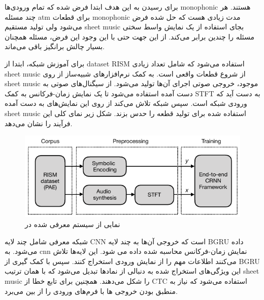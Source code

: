 برای رسیدن به این هدف ابتدا فرض شده که تمام ورودی‌ها \gls{monophonic} هستند. هر
چند مسئله \gls{atm} برای قطعات \gls{monophonic} مدت زیادی هست که حل شده فرض
می‌شود ولی تولید مستقیم \gls{sheet music} بجای استفاده از یک نمایش واسط سختی
مسئله را چندین برابر می‌کند. از این جهت حتی با این وجود این فرض، مسئله همچنان
بسیار چالش برانگیز باقی می‌ماند.

برای آموزش شبکه، ابتدا از \gls{dataset} RISM استفاده می‌شود که شامل تعداد زیادی
\gls{sheet music} از شروع قطعات واقعی است. به کمک نرم‌افزارهای شبیه‌ساز از روی
\gls{sheet music} موجود، خروجی صوتی اجرای آن‌ها تولید می‌شود. از سیگنال‌های صوتی
به دست آمده استفاده می‌شود تا یک نمایش زمان-فرکانس به کمک \gls{STFT} به دست آید
که ورودی شبکه است. سپس شبکه تلاش می‌کند از روی این نمایش‌های به دست آمده
\gls{sheet music} استفاده شده برای تولید قطعه را حدس بزند. شکل زیر نمای کلی این
فرآیند را نشان می‌دهد.
\begin{figure}[ht]
    \centering
    \includegraphics[width=12cm]{./statics/roman2018end_architecture.png}
    \caption{نمایی از سیستم معرفی شده در \cite{roman2018end}}
\end{figure}

شبکه معرفی شامل چند لایه \gls{CNN} است که خروجی آن‌ها به چند لایه \gls{BGRU}
داده می‌شود. به \gls{cnn} نمایش زمان-فرکانس محاسبه شده داده می شود. این لایه‌ها
تلاش می‌کنند اطلاعات مهم را از نمایش ورودی استخراج کنند. سپس با کمک گیری از
\gls{BGRU} این ویژگی‌های استخراج شده به دنبالی از نمادها تبدیل می‌شود که با همان
ترتیب \gls{sheet music} را شکل می‌دهند. همچنین برای تابع خطا از \gls{CTC}
استفاده می‌شود که نیاز به منطبق بودن خروجی ها با فرم‌های ورودی را از بین می‌برد.

